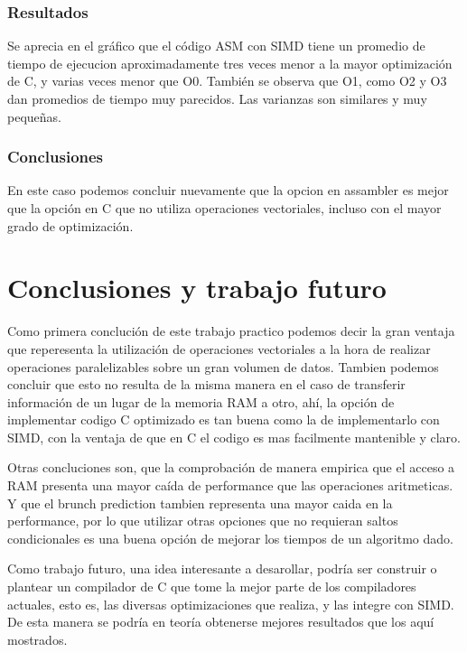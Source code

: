 \documentclass[a4paper]{article}
\begin{document}
\subsubsection{Resultados}
Se aprecia en el gráfico que el código ASM con SIMD tiene un promedio de tiempo de ejecucion aproximadamente tres veces menor a la mayor optimización de C, y varias veces menor que O0. También se observa que O1, como O2 y O3 dan promedios de tiempo muy parecidos. Las varianzas son similares y muy pequeñas.

\subsubsection{Conclusiones}

En este caso podemos concluir nuevamente que la opcion en assambler es mejor que la opción en C que no utiliza operaciones vectoriales, incluso con el mayor grado de optimización.

\newpage
\section{Conclusiones y trabajo futuro}

Como primera conclución de este trabajo practico podemos decir la gran ventaja que reperesenta la utilización de operaciones vectoriales a la hora de realizar operaciones paralelizables sobre un gran volumen de datos. Tambien podemos concluir que esto no resulta de la misma manera en el caso de transferir información de un lugar de la memoria RAM a otro, ahí, la opción de implementar codigo C optimizado es tan buena como la de implementarlo con SIMD, con la ventaja de que en C el codigo es mas facilmente mantenible y claro.

Otras concluciones son, que la comprobación de manera empirica que el acceso a RAM presenta una mayor caída de performance que las operaciones aritmeticas. Y que el brunch prediction tambien representa una mayor caida en la performance, por lo que utilizar otras opciones que no requieran saltos condicionales es una buena opción de mejorar los tiempos de un algoritmo dado.

Como trabajo futuro, una idea interesante a desarollar, podría ser construir o plantear un compilador de C que tome la mejor parte de los compiladores actuales, esto es, las diversas optimizaciones que realiza, y las integre con SIMD. De esta manera se podría en teoría obtenerse mejores resultados que los aquí mostrados.
\end{document}
